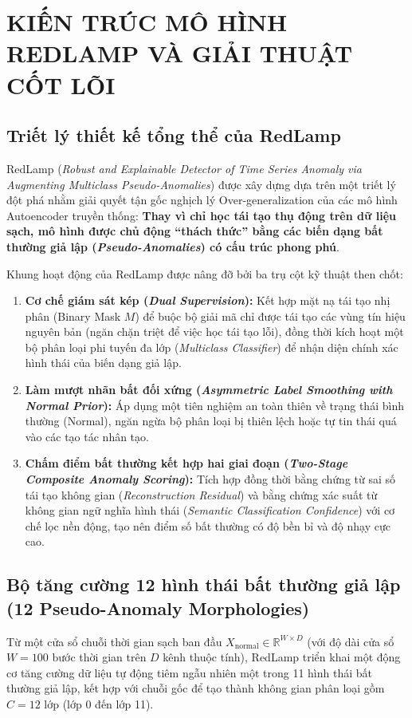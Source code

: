\documentclass[11pt,journal,onecolumn]{IEEEtran}
\begin{document}
\section{KIẾN TRÚC MÔ HÌNH REDLAMP VÀ GIẢI THUẬT CỐT LÕI}
\label{sec:chapter3}

\subsection{Triết lý thiết kế tổng thể của RedLamp}
RedLamp (\textit{Robust and Explainable Detector of Time Series Anomaly via Augmenting Multiclass Pseudo-Anomalies}) được xây dựng dựa trên một triết lý đột phá nhằm giải quyết tận gốc nghịch lý Over-generalization của các mô hình Autoencoder truyền thống: \textbf{Thay vì chỉ học tái tạo thụ động trên dữ liệu sạch, mô hình được chủ động ``thách thức'' bằng các biến dạng bất thường giả lập (\textit{Pseudo-Anomalies}) có cấu trúc phong phú}.

Khung hoạt động của RedLamp được nâng đỡ bởi ba trụ cột kỹ thuật then chốt:
\begin{enumerate}
    \item \textbf{Cơ chế giám sát kép (\textit{Dual Supervision}):} Kết hợp mặt nạ tái tạo nhị phân (Binary Mask $M$) để buộc bộ giải mã chỉ được tái tạo các vùng tín hiệu nguyên bản (ngăn chặn triệt để việc học tái tạo lỗi), đồng thời kích hoạt một bộ phân loại phi tuyến đa lớp (\textit{Multiclass Classifier}) để nhận diện chính xác hình thái của biến dạng giả lập.
    \item \textbf{Làm mượt nhãn bất đối xứng (\textit{Asymmetric Label Smoothing with Normal Prior}):} Áp dụng một tiên nghiệm an toàn thiên về trạng thái bình thường (Normal), ngăn ngừa bộ phân loại bị thiên lệch hoặc tự tin thái quá vào các tạo tác nhân tạo.
    \item \textbf{Chấm điểm bất thường kết hợp hai giai đoạn (\textit{Two-Stage Composite Anomaly Scoring}):} Tích hợp đồng thời bằng chứng từ sai số tái tạo không gian (\textit{Reconstruction Residual}) và bằng chứng xác suất từ không gian ngữ nghĩa hình thái (\textit{Semantic Classification Confidence}) với cơ chế lọc nền động, tạo nên điểm số bất thường có độ bền bỉ và độ nhạy cực cao.
\end{enumerate}

\subsection{Bộ tăng cường 12 hình thái bất thường giả lập (12 Pseudo-Anomaly Morphologies)}
\label{subsec:morphologies}
Từ một cửa sổ chuỗi thời gian sạch ban đầu $X_{\text{normal}} \in \mathbb{R}^{W \times D}$ (với độ dài cửa sổ $W = 100$ bước thời gian trên $D$ kênh thuộc tính), RedLamp triển khai một động cơ tăng cường dữ liệu tự động tiêm ngẫu nhiên một trong 11 hình thái bất thường giả lập, kết hợp với chuỗi gốc để tạo thành không gian phân loại gồm $C = 12$ lớp (lớp 0 đến lớp 11).
\end{document}

